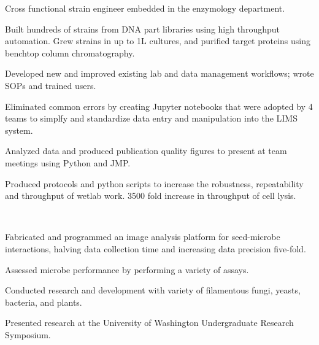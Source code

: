 \documentclass[]{forrest-resume-interfont}
\begin{document}
\begin{tightemize}
    \item Cross functional strain engineer embedded in the enzymology department.
    \item Built hundreds of strains from DNA part libraries using high throughput automation. Grew strains in up to 1L cultures, and purified target proteins using benchtop column chromatography.
    \item Developed new and improved existing lab and data management workflows; wrote SOPs and trained users. 
    \item Eliminated common errors by creating Jupyter notebooks that were adopted by 4 teams to simplfy and standardize data entry and manipulation into the LIMS system.
    \item Analyzed data and produced publication quality figures to present at team meetings using Python and JMP.
    \item Produced protocols and python scripts to increase the robustness, repeatability and throughput of wetlab work. 3500 fold increase in throughput of cell lysis.
\end{tightemize}

\spacesep

\\

\begin{tightemize}
    \item Fabricated and programmed an image analysis platform for seed-microbe interactions, halving data collection time and increasing data precision five-fold.
    \item Assessed microbe performance by performing a variety of assays.
    \item Conducted research and development with variety of filamentous fungi, yeasts, bacteria, and plants.
    \item Presented research at the University of Washington Undergraduate Research Symposium.
\end{tightemize}

\spacesep

\\
\end{document}
